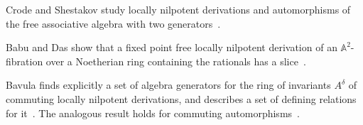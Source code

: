 Crode and Shestakov study locally nilpotent derivations and automorphisms of
the free associative algebra with two
generators~\cite{WlLocallyNilpotentDerivationsAnd2020}.

Babu and Das show that a fixed point free locally nilpotent derivation of an
$\mathbb{A}^2$-fibration over a Noetherian ring containing the rationals has a
slice~\cite{WlStructureOfA2FibrationsHavingF2021}.

Bavula finds explicitly a set of algebra generators for the ring of invariants
$A^\delta$ of commuting locally nilpotent derivations, and describes a set of
defining relations for it~\cite{WlGeneratorsAndDefiningRelations2006}. The analogous result holds for commuting
automorphisms~\cite{WlGeneratorsAndDefiningRelations2006}.
